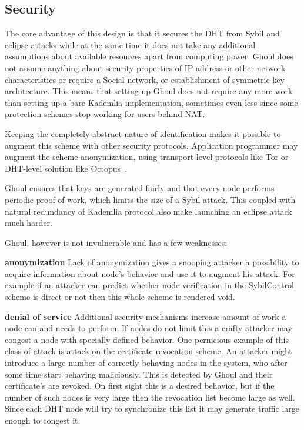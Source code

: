   \subsection{Security}
  The core advantage of this design is that it secures the DHT from Sybil and
  eclipse attacks while at the same time it does not take any additional
  assumptions about available resources apart from computing power. Ghoul does
  not assume anything about security properties of IP address or other network
  characteristics or require a Social network, or establishment of symmetric key
  architecture.  This means that setting up Ghoul does not require any more work
  than setting up a bare Kademlia implementation, sometimes even less since some
  protection schemes stop working for users behind NAT.

  Keeping the completely abstract nature of identification makes it possible to
  augment this scheme with other security protocols. Application programmer may
  augment the scheme anonymization, using transport-level protocols like Tor or
  DHT-level solution like Octopus~\cite{wan12b}.

  Ghoul ensures that keys are generated fairly and that every node performs
  periodic proof-of-work, which limits the size of a Sybil attack. This coupled
  with natural redundancy of Kademlia protocol also make launching an eclipse
  attack much harder.

  Ghoul, however is not invulnerable and has a few weaknesses:

  \begin{description}
    \item{\textbf{anonymization}} Lack of anonymization gives a snooping
      attacker a possibility to acquire information about node's behavior and
      use it to augment his attack. For example if an attacker can predict
      whether node verification in the SybilControl scheme is direct or not then
      this whole scheme is rendered void.
    \item{\textbf{denial of service}} Additional security mechanisms increase
      amount of work a node can and needs to perform. If nodes do not limit this
      a crafty attacker may congest a node with specially defined behavior. One
      pernicious example of this class of attack is attack on the certificate
      revocation scheme. An attacker might introduce a large number of correctly
      behaving nodes in the system, who after some time start behaving
      maliciously. This is detected by Ghoul and their certificate's are
      revoked. On first sight this is a desired behavior, but if the number of
      such nodes is very large then the revocation list become large as well.
      Since each DHT node will try to synchronize this list it may generate
      traffic large enough to congest it.
  \end{description}

